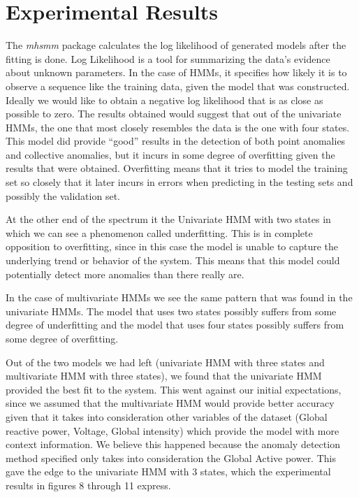 \documentclass[letterpaper, 11pt]{article}%
\begin{document}
\section{Experimental Results}
The \textit{mhsmm} package calculates the log likelihood of generated models after the fitting is done. Log Likelihood is a tool for summarizing the data's evidence about unknown parameters\cite{log}. In the case of HMMs, it specifies how likely it is to observe a sequence like the training data, given the model that was constructed. Ideally we would like to obtain a negative log likelihood that is as close as possible to zero. The results obtained would suggest that out of the univariate HMMs, the one that most closely resembles the data is the one with four states. This model did provide ``good'' results in the detection of both point anomalies and collective anomalies, but it incurs in some degree of overfitting given the results that were obtained. Overfitting means that it tries to model the training set so closely that it later incurs in errors when predicting in the testing sets and possibly the validation set.

At the other end of the spectrum it the Univariate HMM with two states in which we can see a phenomenon called underfitting. This is in complete opposition to overfitting, since in this case the model is unable to capture the underlying trend or behavior of the system. This means that this model could potentially detect more anomalies than there really are.

In the case of multivariate HMMs we see the same pattern that was found in the univariate HMMs. The model that uses two states possibly suffers from some degree of underfitting and the model that uses four states possibly suffers from some degree of overfitting.

Out of the two models we had left (univariate HMM with three states and multivariate HMM with three states), we found that the univariate HMM provided the best fit to the system. This went against our initial expectations, since we assumed that the multivariate HMM would provide better accuracy given that it takes into consideration other variables of the dataset (Global reactive power, Voltage, Global intensity) which provide the model with more context information. We believe this happened because the anomaly detection method specified only takes into consideration the Global Active power. This gave the edge to the univariate HMM with 3 states, which the experimental results in figures 8 through 11 express.
\end{document}
